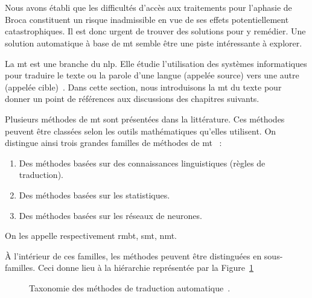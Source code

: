\section{}

Nous avons établi que les difficultés d'accès aux traitements pour l'aphasie de Broca 
constituent un risque inadmissible en vue de ses effets potentiellement catastrophiques.
Il est donc urgent de trouver des solutions pour y remédier.
Une solution automatique à base de \gls{mt} semble être une piste intéressante à explorer.

La \gls{mt} est une branche du \gls{nlp}.
Elle étudie l'utilisation des systèmes informatiques pour traduire le texte ou la parole 
d'une langue (appelée source) vers une autre (appelée cible)~\cite{routledge}.
Dans cette section, nous introduisons la \gls{mt} du texte 
pour donner un point de références aux discussions des chapitres suivants.

Plusieurs méthodes de \gls{mt} sont présentées dans la littérature.
Ces méthodes peuvent être classées selon les outils mathématiques qu'elles utilisent.
On distingue ainsi trois grandes familles de méthodes de \gls{mt}~\cite{deep-nmt-survey} :
\begin{enumerate}
    \item Des méthodes basées sur des connaissances linguistiques (règles de traduction).
    \item Des méthodes basées sur les statistiques.
    \item Des méthodes basées sur les réseaux de neurones.
\end{enumerate}
On les appelle respectivement \gls{rmbt}, \gls{smt}, \gls{nmt}.

À l'intérieur de ces familles, les méthodes peuvent être distinguées en sous-familles.
Ceci donne lieu à la hiérarchie représentée par la Figure~\ref{fig.mt-taxonomy-tree}
\begin{figure}[hbt]
    \centering
    \resizebox{\textwidth}{!}{ }
    \caption[Taxonomie des méthodes de traduction automatique.]
    {Taxonomie des méthodes de traduction automatique~\cite{deep-nmt-survey,hybrid-mt}.}
    \label{fig.mt-taxonomy-tree}
\end{figure}

